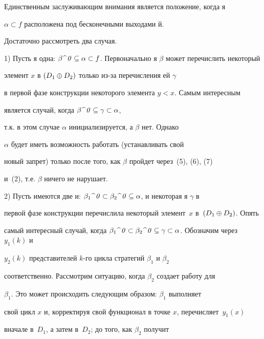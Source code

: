 \begin{pf}


Единственным заслуживающим внимания является положение, когда я


$\alpha\subset f$ расположена под бесконечными выходами й. 


Достаточно рассмотреть два случая.


 


1) Пусть я одна: $\con{\beta}{{\it 0}}\subseteq\alpha


\subset f$. Первоначально я $\beta$ может перечислить некоторый 


элемент $x$ в $(D_1\oplus D_2)$ только из-за перечисления ей $\gamma$


в первой фазе конструкции некоторого элемента $y<x$. Самым интересным 


является случай, когда $\beta\,\widehat{\ }\,{\it 0}\subseteq\gamma\subset\alpha$, 


т.к. в этом случае $\alpha$ инициализируется, а $\beta$ нет. Однако


$\alpha$ будет иметь возможность работать (устанавливать свой


новый запрет) только после того, как $\beta$ пройдет через~(5), (6), (7) 


и~(2), т.е. $\beta$ ничего не нарушает.





2) Пусть имеются две и: $\con{\beta_1}{{\it 0}}\subset\con


{\beta_2}{{\it 0}}\subseteq\alpha$, и некоторая я $\gamma$ в


первой фазе конструкции перечислила некоторый элемент~$x$ в~$(D_1\oplus D_2)$. Опять


самый интересный случай, когда $\con{\beta_1}{{\it 0}}\subset\con


{\beta_2}{{\it 0}}\subseteq\gamma\subset\alpha$. Обозначим через $y_1(k)$ и


$y_2(k)$ представителей $k$-го цикла стратегий $\beta_1$ и $\beta_2$


соответственно. Рассмотрим ситуацию, когда $\beta_2$ создает работу для


$\beta_1$. Это может происходить следующим образом: $\beta_1$ выполняет


свой цикл $x$ и, корректируя свой функционал в точке $x$, перечисляет~$y_1(x)$


вначале в~$D_1$, а затем в~$D_2$; до того, как $\beta_2$ получит



\end{pf}
